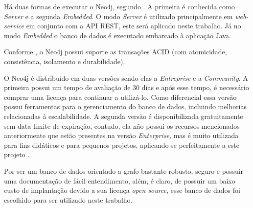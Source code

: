 \par Há duas formas de executar o Neo4j, segundo . A primeira é conhecida como \textit{Server} e a segunda \textit{Embedded}. O modo \textit{Server} é utilizado principalmente em \textit{web-service} em conjunto com a API REST, este será aplicado neste trabalho. Já no modo \textit{Embedded} o banco de dados é executado embarcado à aplicação Java.

\par Conforme , o Neo4j possui suporte as transações ACID (com atomicidade, consistência, isolamento e durabilidade).

O Neo4j é distribuído em duas versões sendo elas a \textit{Entreprise} e a \textit{Community}. A primeira possui um tempo de avaliação de 30 dias e após esse tempo, é necessário comprar uma licença para continuar a utilizá-lo. Como diferencial essa versão possui ferramentas para o gerenciamento do banco de dados, incluindo melhorias relacionadas à escalabilidade. A segunda versão é disponibilizada gratuitamente sem data limite de expiração, contudo, ela não possui os recursos mencionados anteriormente que estão presentes na versão \textit{Enterprise}, mas é muito utilizada para fins didáticos e para pequenos projetos, aplicando-se perfeitamente a este projeto \cite{neo4j_team_manual}.

\par Por ser um banco de dados orientado a grafo bastante robusto, seguro e possuir uma documentação de fácil entendimento, além, é claro, de possuir um baixo custo de implantação devido a sua licença \textit{open source}, esse banco de dados foi escolhido para ser utilizado neste trabalho.
